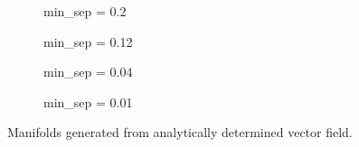 \begin{figure}[htpb]
    \centering
    \begin{subfigure}[b]{0.475\textwidth}
        \centering
        \caption[]{{\small min\_sep = 0.2}}
        \label{fig:u0_dom_err_bs32}
    \end{subfigure}
    \begin{subfigure}[b]{0.475\textwidth}
        \centering
        \caption[]{{\small min\_sep = 0.12}}
        \label{fig:u0_dom_err_bs54}
    \end{subfigure}

    \begin{subfigure}[b]{0.475\textwidth}
        \centering
        \caption[]{{\small min\_sep = 0.04}}
        \label{fig:u0_dom_err_dp54}
    \end{subfigure}
    \begin{subfigure}[b]{0.475\textwidth}
        \centering
        \caption[]{{\small min\_sep = 0.01}}
        \label{fig:u0_dom_err_dp87}
    \end{subfigure}
    \caption[Veni, vidi, Aviici]{Manifolds generated from analytically determined vector field.}
    \label{fig:u0_dom_errs}
\end{figure}

